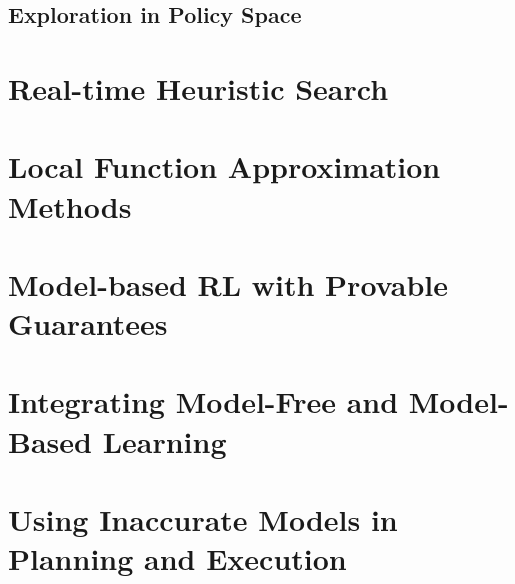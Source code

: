 \subsection{Exploration in Policy Space}
\label{sec:expl-policy-space}


\section{Real-time Heuristic Search}
\label{sec:real-time-heuristic}


\section{Local Function Approximation Methods}
\label{sec:local-funct-appr}


\section{Model-based RL with Provable Guarantees}
\label{sec:model-based-reinf}

% 

\section{Integrating Model-Free and Model-Based Learning}
\label{sec:integr-model-free}


\section{Using Inaccurate Models in Planning and Execution}
\label{sec:using-inacc-models}





